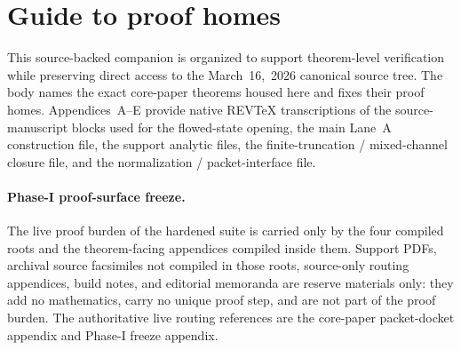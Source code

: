 \documentclass[preprint,aip,jmp,amsmath,amssymb,nofootinbib]{revtex4-2}
\begin{document}

\begin{abstract}
This companion is the source-backed proof home for the Lane~A sharp-local construction cited by the core paper. It is assembled directly from the canonical March~16,~2026 LaTeX source tree and houses the flowed continuum state, the exact-dimension quotient machinery, the one-shell transport and finite-truncation inverse package, the finite-cap mixed-correlator bridge, the finite-cap sharp-local extension, the inductive-union passage, bounded-base cyclicity in the reconstructed sharp-local Hilbert space, and a theorem-level state-construction ledger for the functional backbone. Appendices~A--E carry native REV\TeX{} transcriptions of the source-manuscript Section~4 file, the principal Lane~A construction file, the support analytic files, the finite-truncation interface / mixed-channel closure file, and the normalization / packet-interface file. The companion is uniform throughout in native REV\TeX{} form.
\end{abstract}

\maketitle

\section*{Guide to proof homes}
This source-backed companion is organized to support theorem-level verification while preserving direct access to the March~16,~2026 canonical source tree. The body names the exact core-paper theorems housed here and fixes their proof homes. Appendices~A--E provide native REV\TeX{} transcriptions of the source-manuscript blocks used for the flowed-state opening, the main Lane~A construction file, the support analytic files, the finite-truncation / mixed-channel closure file, and the normalization / packet-interface file.

\paragraph{Phase-I proof-surface freeze.}
The live proof burden of the hardened suite is carried only by the four compiled roots and the theorem-facing appendices compiled inside them. Support PDFs, archival source facsimiles not compiled in those roots, source-only routing appendices, build notes, and editorial memoranda are reserve materials only: they add no mathematics, carry no unique proof step, and are not part of the proof burden. The authoritative live routing references are the core-paper packet-docket appendix and Phase-I freeze appendix.
\end{document}
